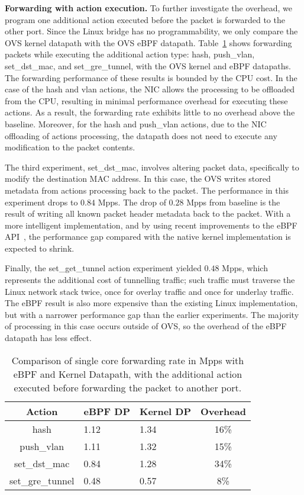 \documentclass[10pt,numbers,reprint]{sigplanconf}
\begin{document}
\textbf{Forwarding with action execution.}
To further investigate the overhead,
we program one additional action executed before the packet is
forwarded to the other port.  Since the Linux bridge has no
programmability, we only compare the OVS kernel datapath with the OVS eBPF
datapath.  Table~\ref{table:ebpfperf} shows forwarding
packets while executing the additional action type: hash, push\_vlan,
set\_dst\_mac, and set\_gre\_tunnel, with the OVS kernel and eBPF datapaths.
The forwarding performance of these results is bounded by the CPU cost.
In the case of the hash and vlan actions, the NIC allows the processing
to be offloaded from the CPU, resulting in minimal performance overhead for
executing these actions.  As a result, the forwarding rate exhibits little
to no overhead above the baseline.
Moreover, for the hash and push\_vlan actions, due to the NIC offloading of
actions processing, the datapath does not need to execute any modification to
the packet contents.

The third experiment, set\_dst\_mac, involves
altering packet data, specifically to modify the destination MAC address. In
this case, the OVS writes stored metadata from actions processing back to
the packet. The performance in this experiment drops to $0.84$ Mpps. The drop
of $0.28$ Mpps from baseline is the result of writing all known
packet header metadata back to the packet. With a more intelligent
implementation, and by using recent improvements to the eBPF
API~\cite{dpa1,dpa2}, the performance gap compared with the native kernel
implementation is expected to shrink.

Finally, the set\_get\_tunnel action experiment yielded $0.48$ Mpps, which
represents the additional cost of tunnelling traffic; such traffic must
traverse the Linux network stack twice, once for overlay traffic and
once for underlay traffic. The eBPF result is also more expensive than
the existing Linux implementation, but with a narrower performance gap
than the earlier experiments. The majority of processing in this case occurs
outside of OVS, so the overhead of the eBPF datapath has less effect.

\begin{table}
\centering
\small
\begin{tabular}{|c | p{1.4cm} | p{1.4cm}| c|}
\hline
{\bf Action} & {\bf eBPF DP} & {\bf Kernel DP} & {\bf Overhead}\\ \hline 
hash & 1.12 & 1.34 & 16\%\\ \hline
push\_vlan & 1.11 & 1.32 & 15\% \\ \hline
set\_dst\_mac & 0.84 &  1.28 & 34\% \\ \hline
set\_gre\_tunnel & 0.48 & 0.57 & 8\%\\ \hline 
\end{tabular}
\caption{\footnotesize Comparison of single core forwarding rate in Mpps
with eBPF and Kernel Datapath, with the additional
action executed before forwarding the packet to another port.}
\label{table:ebpfperf}
\end{table}
\end{document}
